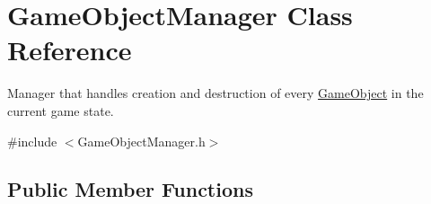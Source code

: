 \hypertarget{classGameObjectManager}{}\section{Game\+Object\+Manager Class Reference}
\label{classGameObjectManager}


Manager that handles creation and destruction of every \hyperlink{classGameObject}{Game\+Object} in the current game state.  




{\ttfamily \#include $<$Game\+Object\+Manager.\+h$>$}

\subsection*{Public Member Functions}
